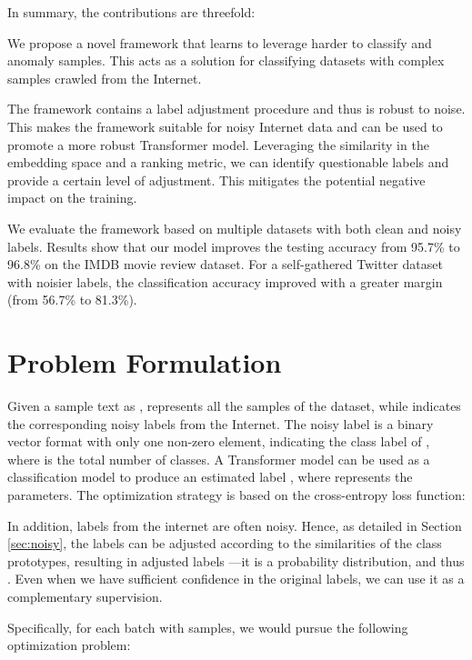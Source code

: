 \documentclass[letterpaper]{article} \usepackage{aaai22}  \usepackage{times}  \usepackage{helvet}  \usepackage{courier}  \usepackage{amsmath,amssymb}
\begin{document}
In summary, the contributions are threefold:

\noindent  We propose a novel framework that learns to leverage harder to classify and anomaly samples. This acts as a solution for classifying datasets with complex samples crawled from the Internet. 
 
\noindent  The framework contains a label adjustment procedure and thus is robust to noise. This makes the framework suitable for noisy Internet data and can be used to promote a more robust Transformer model. Leveraging the similarity in the embedding space and a ranking metric, we can identify questionable labels and provide a certain level of adjustment. This mitigates the potential negative impact on the training.
 
 
\noindent  We evaluate the framework based on multiple datasets with both clean and noisy labels. Results show that our model improves the testing accuracy from 95.7\% to 96.8\% on the IMDB movie review dataset. For a self-gathered Twitter dataset with noisier labels, the classification accuracy improved with a greater margin  (from 56.7\% to 81.3\%).
\medskip 

 \section{Problem Formulation}
\label{section-preliminary}
Given a sample text as ,  represents all the  samples of the dataset, while  indicates the corresponding noisy labels from the Internet.
The noisy label  is a binary vector format with only one non-zero element, indicating the class label of
, where  is the total number of classes.
A Transformer model  can be used as a classification model to produce an estimated label , where  represents the parameters.
The optimization strategy is based on the cross-entropy loss function:


In addition, labels from the internet are often noisy. Hence, as detailed in Section \ref{sec:noisy}, the labels can be adjusted according to the similarities of the class prototypes, resulting in adjusted labels ---it is a probability distribution, and thus . Even when we have sufficient confidence in the original labels, we can use it as a complementary supervision.



Specifically, for each batch with  samples, we would pursue the following optimization problem:
\end{document}
